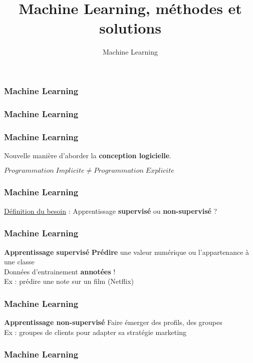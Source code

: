 \documentclass{formation}
\title{Machine Learning, méthodes et solutions}
\subtitle{Machine Learning}
\begin{document}
\maketitle

\begin{frame}
  \frametitle{Machine Learning}
\end{frame}

\begin{frame}
  \frametitle{Machine Learning}
\end{frame}

\begin{frame}
  \frametitle{Machine Learning}
  \begin{center}
  Nouvelle manière d'aborder la \textbf{conception logicielle}.
  \end{center}
  \begin{center}
  $\boxed{Programmation\;Implicite \neq Programmation\;Explicite}$
  \end{center}
\end{frame}

\begin{frame}
  \frametitle{Machine Learning}
  \underline{Définition du besoin} :
  \newline
  \newline
  Apprentissage \textbf{supervisé} ou \textbf{non-supervisé} ?
\end{frame}

\begin{frame}
  \frametitle{Machine Learning}
  \textbf{Apprentissage supervisé}
  \newline \newline
  \textbf{Prédire} une valeur numérique ou l'appartenance à une classe\\
  \newline
  Données d'entrainement \textbf{annotées} ! \\
  \newline
  Ex : prédire une note sur un film (Netflix)
\end{frame}

\begin{frame}
  \frametitle{Machine Learning}
  \textbf{Apprentissage non-supervisé}
  \newline \newline
  Faire émerger des profils, des groupes \\
  \newline
  Ex : groupes de clients pour adapter sa stratégie marketing \\
\end{frame}

\begin{frame}
  \frametitle{Machine Learning}
\end{frame}
\end{document}
